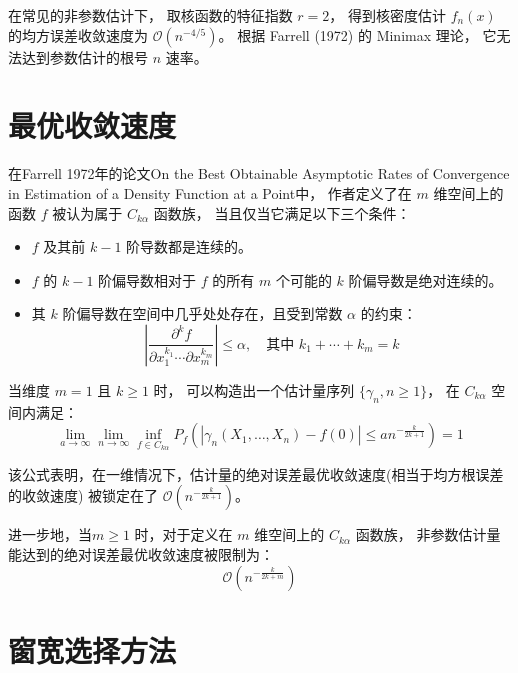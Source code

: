 \documentclass[UTF8]{ctexart}
\begin{document}
在常见的非参数估计下，
取核函数的特征指数 $r = 2$，
得到核密度估计 $f_n(x)$ 的均方误差收敛速度为 $\mathcal{O}(n^{-4/5})$。
根据 Farrell (1972) 的 Minimax 理论，
它无法达到参数估计的根号 $n$ 速率。

\section{最优收敛速度}

在Farrell 1972年的论文On the Best Obtainable Asymptotic Rates of Convergence in Estimation of a Density Function at a Point中，
作者定义了在 $m$ 维空间上的函数 $f$ 被认为属于 $C_{k\alpha}$ 函数族，
当且仅当它满足以下三个条件：

\begin{itemize}
    \item $f$ 及其前 $k-1$ 阶导数都是连续的。
    \item $f$ 的 $k-1$ 阶偏导数相对于 $f$ 的所有 $m$ 个可能的 $k$ 阶偏导数是绝对连续的。
    \item 其 $k$ 阶偏导数在空间中几乎处处存在，且受到常数 $\alpha$ 的约束：
    \begin{equation}
    \left| \frac{\partial^k f}{\partial x_1^{k_1} \cdots \partial x_m^{k_m}} \right| \le \alpha, \quad \text{其中 } k_1 + \cdots + k_m = k
    \end{equation}
\end{itemize}

当维度 $m=1$ 且 $k \ge 1$ 时，
可以构造出一个估计量序列 $\{\gamma_n, n \ge 1\}$，
在 $C_{k\alpha}$ 空间内满足：
\begin{equation}
\lim_{a \rightarrow \infty} \lim_{n \rightarrow \infty} \inf_{f \in C_{k\alpha}} P_f \left( |\gamma_n(X_1, \dots, X_n) - f(0)| \le a n^{-\frac{k}{2k+1}} \right) = 1
\end{equation}

该公式表明，在一维情况下，估计量的绝对误差最优收敛速度(相当于均方根误差的收敛速度)
被锁定在了 $\mathcal{O}(n^{-\frac{k}{2k+1}})$。

进一步地，当$m \ge 1$ 时，对于定义在 $m$ 维空间上的 $C_{k\alpha}$ 函数族，
非参数估计量能达到的绝对误差最优收敛速度被限制为：
\begin{equation}
\mathcal{O}\left(n^{-\frac{k}{2k+m}}\right)
\end{equation}

\section{窗宽选择方法}
\end{document}
